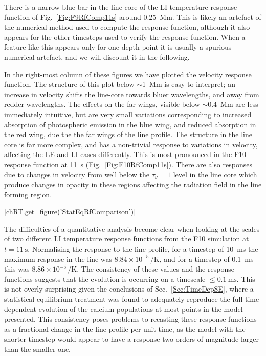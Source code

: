 There is a narrow blue bar in the line core of the LI temperature response function of Fig.~\ref{Fig:F9RfComp11s} around \SI{0.25}{\mega\metre}.
This is likely an artefact of the numerical method used to compute the response function, although it also appears for the other timesteps used to verify the response function.
When a feature like this appears only for one depth point it is usually a spurious numerical artefact, and we will discount it in the following.

In the right-most column of these figures we have plotted the velocity response function.
The structure of this plot below $\sim$\SI{1}{\mega\metre} is easy to interpret; an increase in velocity shifts the line-core towards bluer wavelengths, and away from redder wavelengths.
The effects on the far wings, visible below $\sim$\SI{0.4}{\mega\metre} are less immediately intuitive, but are very small variations corresponding to increased absorption of photospheric emission in the blue wing, and reduced absorption in the red wing, due the the far wings of the line profile.
The structure in the line core is far more complex, and has a non-trivial response to variations in velocity, affecting the LE and LI cases differently.
This is most pronounced in the F10 response function at \SI{11}{\second} (Fig.~\ref{Fig:F10RfComp11s}).
There are also responses due to changes in velocity from well below the $\tau_\nu=1$ level in the line core which produce changes in opacity in these regions affecting the radiation field in the line forming region.

\py[TimeDepRT]|chRT.get_figure('StatEqRfComparison')|

The difficulties of a quantitative analysis become clear when looking at the scales of two different LI temperature response functions from the F10 simulation at $t=\SI{11}{\s}$.
Normalising the response to the line profile, for a timestep of \SI{10}{\milli\s} the maximum response in the \CaLine{} line was $8.84\times{}10^{-5}\,\si{\per\kelvin}$, and for
a timestep of \SI{0.1}{\milli\s} this was $8.86\times{}10^{-5}\,\si{\per\kelvin}$.
The consistency of these values and the response functions suggests that the evolution is occurring on a timescale $\leq \SI{0.1}{\milli\s}$.
This is not overly surprising given the conclusions of Sec.~\ref{Sec:TimeDepSE}, where a statistical equilibrium treatment was found to adequately reproduce the full time-dependent evolution of the calcium populations at most points in the model presented.
This consistency poses problems to recasting these response functions as a fractional change in the line profile per unit time, as the model with the shorter timestep would appear to have a response two orders of magnitude larger than the smaller one.

